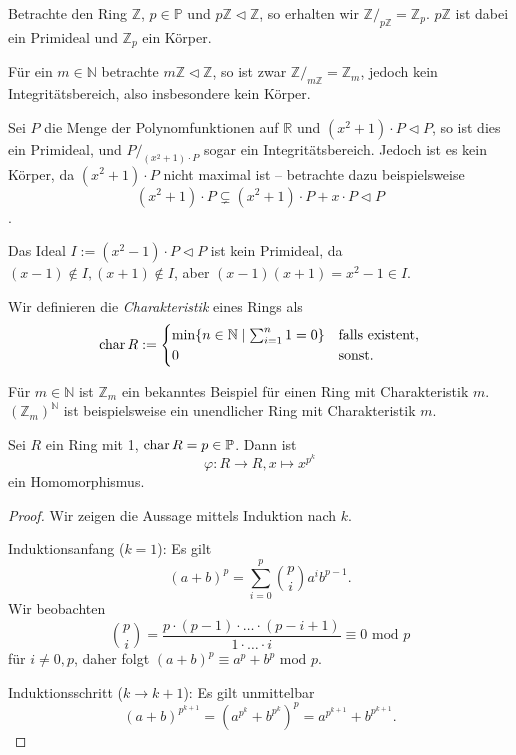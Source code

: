 
\begin{example}
    Betrachte den Ring $\mathbb{Z}$, $p \in \mathbb{P}$ und $p \mathbb{Z} \vartriangleleft \mathbb{Z}$, so erhalten wir $\mathbb{Z}/_{p\mathbb{Z}} = \mathbb{Z}_p$.
    $p\mathbb{Z}$ ist dabei ein Primideal und $\mathbb{Z}_p$ ein Körper.

    Für ein $m \in \mathbb{N}$ betrachte $m \mathbb{Z} \vartriangleleft \mathbb{Z}$, so ist zwar $\mathbb{Z} /_{m\mathbb{Z}} = \mathbb{Z}_m$, jedoch kein Integritätsbereich,
    also insbesondere kein Körper.
\end{example}

\begin{example}
    Sei $P$ die Menge der Polynomfunktionen auf $\mathbb{R}$ und $(x^2+1) \cdot P \vartriangleleft P$, so ist dies ein Primideal, und $P/_{(x^2+1) \cdot P}$ sogar ein Integritätsbereich. Jedoch ist es kein Körper, da $(x^2+1) \cdot P$ nicht maximal ist -- betrachte dazu beispielsweise
    $$ (x^2 + 1) \cdot P \subsetneq (x^2+1) \cdot P + x \cdot P \vartriangleleft P $$.

    Das Ideal $I := (x^2 - 1) \cdot P \vartriangleleft P$ ist kein Primideal, da $(x-1)\notin I, (x+1) \notin I$, aber $(x-1)(x+1) = x^2 - 1 \in I$.
\end{example}

\begin{definition}
    Wir definieren die \emph{Charakteristik} eines Rings als
    $$ \operatorname{char} R := 
    \begin{cases}
        \min\{n\in\mathbb{N}\mid\sum_{i=1}^n 1=0\} & \text{falls existent,}\\
        0 & \text{sonst}.
    \end{cases}
        $$
\end{definition}

\begin{example}
    Für $m\in\mathbb{N}$ ist $\mathbb{Z}_m$ ein bekanntes Beispiel für einen Ring mit Charakteristik $m$.
    $(\mathbb{Z}_m)^{\mathbb{N}}$ ist beispielsweise ein unendlicher Ring mit Charakteristik $m$.
\end{example}

\begin{proposition}
    Sei $R$ ein Ring mit 1, $\operatorname{char} R = p \in \mathbb{P}$. Dann ist
    $$ \varphi : R \to R, x \mapsto x^{p^k} $$
    ein Homomorphismus.
\end{proposition}

\begin{proof}
    Wir zeigen die Aussage mittels Induktion nach $k$.

    Induktionsanfang ($k = 1$): Es gilt
    $$ (a+b)^p = \sum_{i=0}^p {p \choose i} a^i b^{p-1}. $$
    Wir beobachten
    $$ {p \choose i} = \frac{p \cdot (p-1) \cdot \hdots \cdot (p-i+1)}{1\cdot \ldots \cdot i} \equiv 0 \text{ mod } p $$
    für $i\neq 0,p$, daher folgt $(a+b)^p\equiv a^p+b^p\text{ mod }p$.

    Induktionsschritt ($k\to k+1$): Es gilt unmittelbar
    $$(a+b)^{p^{k+1}}=(a^{p^k}+b^{p^k})^p=a^{p^{k+1}}+b^{p^{k+1}}.$$
\end{proof}

